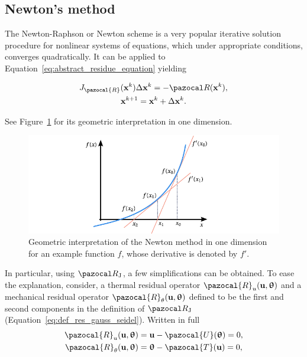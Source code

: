 \subsection{Newton's method}

The Newton-Raphson or Newton scheme is a very popular iterative solution procedure for nonlinear systems of equations, which under appropriate conditions, converges quadratically.
It can be applied to Equation~\eqref{eq:abstract_residue_equation} yielding
\begin{highlight}[innertopmargin=-5pt]
  \begin{gather}
    J_\pazocal{R}(\mathbf x^k)\Delta \mathbf x^k = - \pazocal R(\mathbf x^k), \label{eq:newton_system}\\
    \mathbf x^{k+1} = \mathbf x^k + \Delta \mathbf x^k. \label{eq:newton_iter}
  \end{gather}
\end{highlight}
See Figure~\ref{fig:newton_method} for its geometric interpretation in one dimension.

\begin{figure}[htbp]
  \includegraphics{figures/newton_method}
  \caption{Geometric interpretation of the Newton method in one dimension for an example function \(f\), whose derivative is denoted by \(f'\).}
  \label{fig:newton_method}
\end{figure}

In particular, using \(\pazocal R_\mathrm{J}\), a few simplifications can be obtained.
To ease the explanation, consider, a thermal residual operator $\pazocal{R}_{u}(\mathbf{u}, \bm{\uptheta})$ and a mechanical residual operator $\pazocal{R}_{\theta}(\mathbf{u}, \bm{\uptheta})$ defined to be the first and second components in the definition of \(\pazocal R_\mathrm{J}\) (Equation~\eqref{eq:def_res_gauss_seidel}).
Written in full
\begin{gather}
\pazocal{R}_{u}(\mathbf{u}, \bm{\uptheta})=\mathbf{u}-\pazocal{U}(\bm{\uptheta})=0, \\
\pazocal{R}_{\theta}(\mathbf{u}, \bm{\uptheta})=\bm{\uptheta}-\pazocal{T}(\mathbf{u})=0,
\end{gather}

